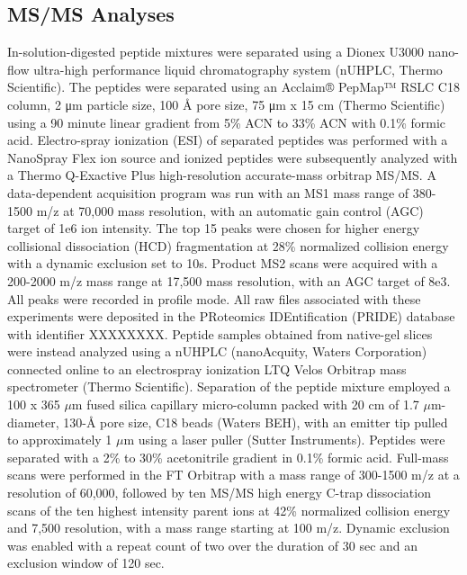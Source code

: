 \subsection{MS/MS Analyses}
In-solution-digested peptide mixtures were separated using a Dionex U3000 nano-flow ultra-high performance liquid chromatography system (nUHPLC, Thermo Scientific). The peptides were separated using an Acclaim® PepMap™ RSLC C18 column, 2 μm particle size, 100 Å pore size, 75 μm x 15 cm (Thermo Scientific) using a 90 minute linear gradient from 5\% ACN to 33\% ACN with 0.1\% formic acid. Electro-spray ionization (ESI) of separated peptides was performed with a NanoSpray Flex ion source and ionized peptides were subsequently analyzed with a Thermo Q-Exactive Plus high-resolution accurate-mass orbitrap MS/MS. A data-dependent acquisition program was run with an MS1 mass range of 380-1500 m/z at 70,000 mass resolution, with an automatic gain control (AGC) target of 1e6 ion intensity. The top 15 peaks were chosen for higher energy collisional dissociation (HCD) fragmentation at 28\% normalized collision energy with a dynamic exclusion set to 10s. Product MS2 scans were acquired with a 200-2000 m/z mass range at 17,500 mass resolution, with an AGC target of 8e3. All peaks were recorded in profile mode. All raw files associated with these experiments were deposited in the PRoteomics IDEntification (PRIDE) database with identifier XXXXXXXX.
Peptide samples obtained from native-gel slices were instead analyzed using a nUHPLC (nanoAcquity, Waters Corporation) connected online to an electrospray ionization LTQ Velos Orbitrap mass spectrometer (Thermo Scientific).  Separation of the peptide mixture employed a 100 x 365 $\mu$m fused silica capillary micro-column packed with 20 cm of 1.7 $\mu$m-diameter, 130-Å pore size, C18 beads (Waters BEH), with an emitter tip pulled to approximately 1 $\mu$m using a laser puller (Sutter Instruments).  Peptides were separated with a 2\% to 30\% acetonitrile gradient in 0.1\% formic acid.  Full-mass scans were performed in the FT Orbitrap with a mass range of 300-1500 m/z at a resolution of 60,000, followed by ten MS/MS high energy C-trap dissociation scans of the ten highest intensity parent ions at 42\% normalized collision energy and 7,500 resolution, with a mass range starting at 100 m/z.  Dynamic exclusion was enabled with a repeat count of two over the duration of 30 sec and an exclusion window of 120 sec.

